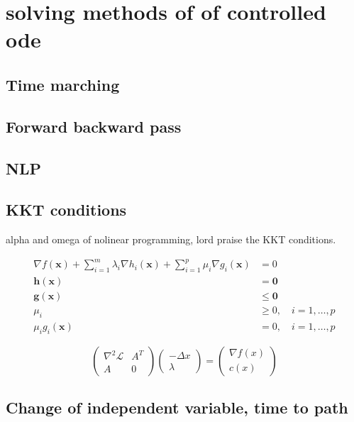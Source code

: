 \chapter{solving methods of of controlled ode}
\section{Time marching}
\section{Forward backward pass}

\section{NLP}
\section{KKT conditions}
alpha and omega of nolinear programming, lord praise the  KKT conditions.	

\begin{equation}
\begin{aligned}
    \nabla f(\mathbf{x}) + \sum_{i=1}^{m} \lambda_i \nabla h_i(\mathbf{x}) + \sum_{i=1}^{p} \mu_i \nabla g_i(\mathbf{x}) &= 0 \\
    \mathbf{h}(\mathbf{x}) &= \mathbf{0} \\
    \mathbf{g}(\mathbf{x}) &\leq \mathbf{0} \\
    \mu_i &\geq 0, \quad i = 1, \ldots, p \\
    \mu_i g_i(\mathbf{x}) &= 0, \quad i = 1, \ldots, p
\end{aligned}
\end{equation}

\begin{equation}
    \begin{pmatrix}
        \nabla^2 \mathcal{L} & A^T \\
        A                    & 0
    \end{pmatrix}
    \begin{pmatrix}
        -\Delta x \\
        \lambda
    \end{pmatrix}
    =
    \begin{pmatrix}
        \nabla f(x) \\
        c(x)
    \end{pmatrix}
\end{equation}

\section{Change of independent variable, time to path}

